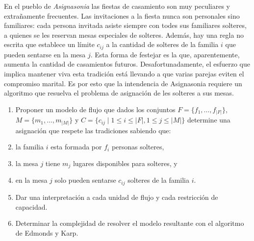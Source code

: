 

 \item En el pueblo de \emph{Asignasonia} las fiestas de casamiento son muy peculiares y extrañamente frecuentes.  Las invitaciones a la fiesta nunca son personales sino familiares: cada persona invitada asiste siempre con todes sus familiares solteres, a quienes se les reservan mesas especiales de solteres.  Además, hay una regla no escrita que establece un límite $c_{ij}$ a la cantidad de solteres de la familia $i$ que pueden sentarse en la mesa $j$.  Esta forma de festejar es la que, aparentemente, aumenta la cantidad de casamientos futuros.  Desafortunadamente, el esfuerzo que implica mantener viva esta tradición está llevando a que varias parejas eviten el compromiso marital.  Es por esto que la intendencia de Asignasonia requiere un algoritmo que resuelva el problema de asignación de les solteres a sus mesas.  
 \begin{enumerate}[label=$\alph*)$,ref=$\alph*)$]
  \item Proponer un modelo de flujo que dados los conjuntos $F = \{f_1, \ldots, f_{|F|}\}$, $M = \{m_1, \ldots, m_{|M|}\}$ y $C = \{c_{ij} \mid 1 \leq i \leq |F|, 1 \leq j \leq |M|\}$ determine una asignación que respete las tradiciones sabiendo que:
   \item la familia $i$ esta formada por $f_i$ personas solteres,
   \item la mesa $j$ tiene $m_j$ lugares disponibles para solteres, y
   \item en la mesa $j$ solo pueden sentarse $c_{ij}$ solteres de la familia $i$.  
  \item Dar una interpretación a cada unidad de flujo y cada restricción de capacidad.
  \item Determinar la complejidad de resolver el modelo resultante con el algoritmo de Edmonds y Karp.
 \end{enumerate}


